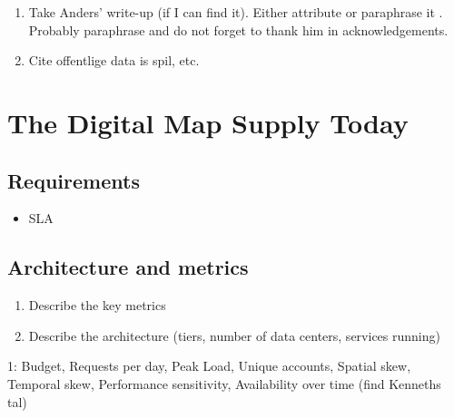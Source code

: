 \documentclass[11pt, oneside]{report}
\begin{document}
\begin{enumerate}
\item Take Anders' write-up (if I can find it). Either attribute or paraphrase it . Probably paraphrase and do not forget to thank him in acknowledgements.
\item Cite offentlige data is spil, etc.
\end{enumerate}

\section{The Digital Map Supply Today}


\subsection{Requirements}
\begin{itemize}
\item SLA
\end{itemize}

\subsection{Architecture and metrics}
\begin{enumerate}
\item Describe the key metrics
\item Describe the architecture (tiers, number of data centers, services running)
\end{enumerate}

1:  Budget, Requests per day, Peak Load, Unique accounts, Spatial skew, Temporal skew, Performance sensitivity, Availability over time (find Kenneths tal)
\end{document}
